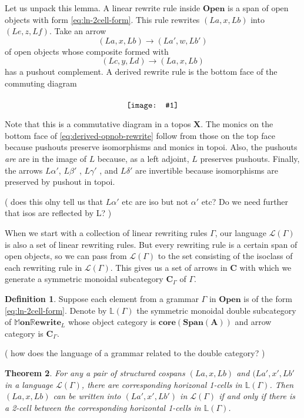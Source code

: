 \documentclass{amsart}
\newcommand{\LL}{\mathbb{L}}
\newcommand{\A}{\cat{A}}
\newcommand{\C}{\cat{C}}
\newcommand{\LinArrCat}{\cat{C}}
\newcommand{\X}{\cat{X}}
\newcommand{\core}{\mathbf{core}}
\newcommand{\cat}[1]{\mathbf{#1}}
\newcommand{\diagram}[1]{\raisebox{-0.5\height}{\texttt{[image: \#1]}}}
\newcommand{\Span}{\mathbf{Span}}
\newcommand{\OpenOb}{\mathbf{Open} }
\newcommand{\MMonRewrite}{ \mathbb{M}\mathbf{on}\mathbb{R}\mathbf{ewrite} }
\newcommand{\edit}[1]{\textcolor{editcolour}{(#1)}}
\newtheorem{theorem}{Theorem}[section]
\theoremstyle{remark}
\theoremstyle{definition}
\newtheorem{definition}[theorem]{Definition}
\begin{document}
Let us unpack this lemma.  A linear rewrite rule inside \( \OpenOb \)
is a span of open objects with form \eqref{eq:ln-2cell-form}.  This
rule rewrites \( ( La , x , Lb ) \) into \( ( Le , z , Lf ) \). Take
an arrow
  \[
    ( La , x , Lb ) \to ( La' , w , Lb' )
  \]
of open objects whose composite formed with
  \[
    ( Lc , y , Ld) \to ( La , x , Lb)
  \]
has a pushout complement. A derived rewrite rule is the bottom face of
the commuting diagram
  
\begin{equation} \label{eq:derived-opnob-rewrite}
   \diagram{diag_lr_derived-rewrite-rule}
\end{equation}

Note that this is a commutative diagram in a topos \( \X \). The
monics on the bottom face of \eqref{eq:derived-opnob-rewrite} follow
from those on the top face because pushouts preserve isomorphisms and
monics in topoi. Also, the pushouts \emph{are} are in the image of \(
L \) because, as a left adjoint, \( L \) preserves pushouts. Finally,
the arrows \( L \alpha' \), \( L \beta' \) , \( L \gamma' \) , and \(
L \delta' \) are invertible because isomorphisms are preserved by
pushout in topoi.

\edit{ does this olny tell us that $L\alpha'$ etc are iso but not
  $\alpha'$ etc? Do we need further that isos are reflected by L?  }
 
When we start with a collection of linear rewriting rules \( \Gamma
\), our language \( \mathcal{ L } ( \Gamma ) \) is also a set of
linear rewriting rules.  But every rewriting rule is a certain span of
open objects, so we can pass from \( \mathcal{L} ( \Gamma ) \) to the
set consisting of the isoclass of each rewriting rule in \(
\mathcal{L} ( \Gamma ) \). This gives us a set of arrows in \( \C \)
with which we generate a symmetric monoidal subcategory \(
\LinArrCat_\Gamma \) of \( \Gamma \).

\begin{definition} \label{df:gramr-gen-dbl-cat}
  Suppose each element from a grammar $ \Gamma $ in $ \OpenOb $ is of
  the form \eqref{eq:ln-2cell-form}.  Denote by $ \LL ( \Gamma ) $ the
  symmetric monoidal double subcategory of $ \MMonRewrite_{L} $ whose
  object category is \( \core ( \Span ( \A ) ) \) and arrow category
  is \( \LinArrCat_\Gamma \).
\end{definition}

\edit{ how does the language of a grammar related to the double category? } 

\begin{theorem}
  For any a pair of structured cospans \( (La,x,Lb) \) and
  \( (La',x',Lb' \) in a language \( \mathcal{L} (\Gamma) \), there
  are corresponding horizonal 1-cells in \( \LL (\Gamma) \). Then
  \( (La,x,Lb) \) can be written into \( (La',x',Lb') \) in
  \( \mathcal{L} (\Gamma) \) if and only if there is a 2-cell between
  the corresponding horizontal 1-cells in \( \LL (\Gamma) \).
\end{theorem}
\end{document}
